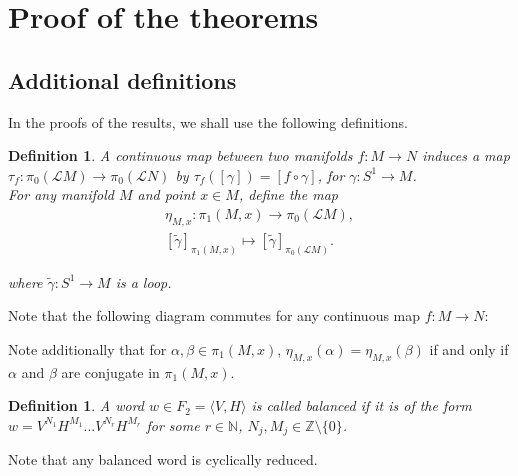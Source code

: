 \documentclass[11pt]{article}
\newenvironment{myequation}
    {
        \begin{equation*}
        \begin{gathered}
    }
    { 
        \end{gathered} 
        \end{equation*}
    }
\newtheorem{definition}[theorem]{Definition}
\newcommand{\N}{\mathbb{N}}
\newcommand{\Z}{\mathbb{Z}}
\begin{document}
\section{Proof of the theorems}\label{sec:3}
    \subsection{Additional definitions}
        In the proofs of the results, we shall use the following definitions.
        
        \begin{definition}
            A continuous map between two manifolds $f: M \to N$ induces a map $\tau_f: \pi_0(\mathscr{L}M) \to \pi_0(\mathscr{L}N)$ by $\tau_f([\gamma]) = [f \circ \gamma]$, for $\gamma: S^1 \to M$. \\
            
            For any manifold $M$ and point $x \in M$, define the map
            \begin{myequation}
                \eta_{M,x} : \pi_1(M,x) \to \pi_0(\mathscr{L}M) , \\
                [\tilde{\gamma}]_{\pi_1(M,x)} \mapsto [\tilde{\gamma}]_{\pi_0(\mathscr{L}M)}.
            \end{myequation}
            
            where $\tilde{\gamma}: S^1 \to M$ is a loop.
        \end{definition}
        Note that the following diagram commutes for any continuous map $f: M \to N$:
        \begin{center}\end{center}
        Note additionally that for $\alpha, \beta \in \pi_1(M,x)$, $\eta_{M,x}(\alpha) = \eta_{M,x}(\beta)$ if and only if $\alpha$ and $\beta$ are conjugate in $\pi_1(M,x)$.
        
        \begin{definition}
            A word $w \in F_2 = \langle V,H \rangle$ is called \textit{balanced} if it is of the form $w = V^{N_1} H^{M_1} ... V^{N_r} H^{M_r}$ for some $r \in \N$, $N_j,M_j \in \Z \setminus \{0\}$.
        \end{definition}
        Note that any balanced word is cyclically reduced.
        
\end{document}
